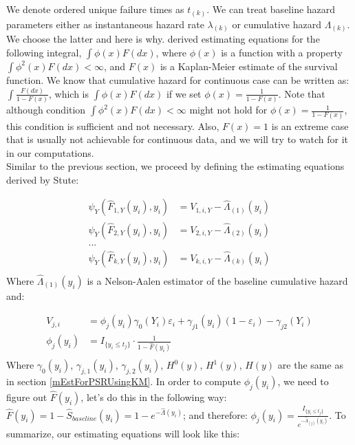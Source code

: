 \documentclass[]{article}
\let\epsilon\varepsilon
\begin{document}
We denote ordered unique failure times as $t_{(k)}$. We can treat baseline hazard parameters either as instantaneous hazard rate $\lambda_{(k)}$ or cumulative hazard $\Lambda_{(k)}$. We choose the latter and here is why. \cite{stute1995central} derived estimating equations for the following integral, $\int \phi(x) F(dx)$, where $\phi(x)$ is a function with a property $\int \phi^2(x) F(dx) < \infty$, and $F(x)$ is a Kaplan-Meier estimate of the survival function. We know that cumulative hazard for continuous case can be written as: $\int \frac{F(dx)}{1 - F(x)}$, which is $\int \phi(x) F(dx)$ if we set $\phi(x) = \frac{1}{1-F(x)}$. Note that although condition $\int \phi^2(x) F(dx) < \infty$ might not hold for $\phi(x) = \frac{1}{1-F(x)}$, this condition is sufficient and not necessary. Also, $F(x) = 1$ is an extreme case that is usually not achievable for continuous data, and we will try to watch for it in our computations.\\

Similar to the previous section, we proceed by defining the estimating equations derived by Stute:

$$
  \begin{aligned}
    \psi_{Y}(\hat{F}_{1,Y}(y_i), y_i) &= V_{1,i,Y} - \hat{\Lambda}_{(1)}(y_i)\\
    \psi_{Y}(\hat{F}_{2,Y}(y_i), y_i) &= V_{2,i,Y} - \hat{\Lambda}_{(2)}(y_i)\\
    ...\\
    \psi_{Y}(\hat{F}_{k,Y}(y_i), y_i) &= V_{k,i,Y} - \hat{\Lambda}_{(k)}(y_i)\\
  \end{aligned}
$$
Where $\hat{\Lambda}_{(1)}(y_i)$ is a Nelson-Aalen estimator of the baseline cumulative hazard and:

$$
  \begin{aligned}
    V_{j,i} &= \phi_j(y_i) \gamma_0(Y_i) \epsilon_i + \gamma_{j1}(y_i)(1 - \epsilon_i) - \gamma_{j2}(Y_i)\\
    \phi_j(y_i) &= I_{\{ y_i \leq t_j \}} \cdot  \frac{1}{1-\hat{F}(y_i)}\\
  \end{aligned}
$$
Where $\gamma_0(y_i)$, $\gamma_{j,1}(y_i)$, $\gamma_{j,2}(y_i)$, $H^0(y)$, $H^1(y)$, $H(y)$ are the same as in section \ref{mEstForPSRUsingKM}. In order to compute $\phi_j(y_i)$, we need to figure out $\hat{F}(y_i)$, let's do this in the following way: $\hat{F}(y_i) = 1 - \hat{S}_{baseline}(y_i) =  1 - e^{-\hat{\Lambda}(y_i)}$; and therefore: $\phi_j(y_i) = \frac{I_{\{ y_i \leq t_j \}}}{e^{-\hat{\Lambda}_{(j)}(y_i)}}$. To summarize, our estimating equations will look like this:
\end{document}
